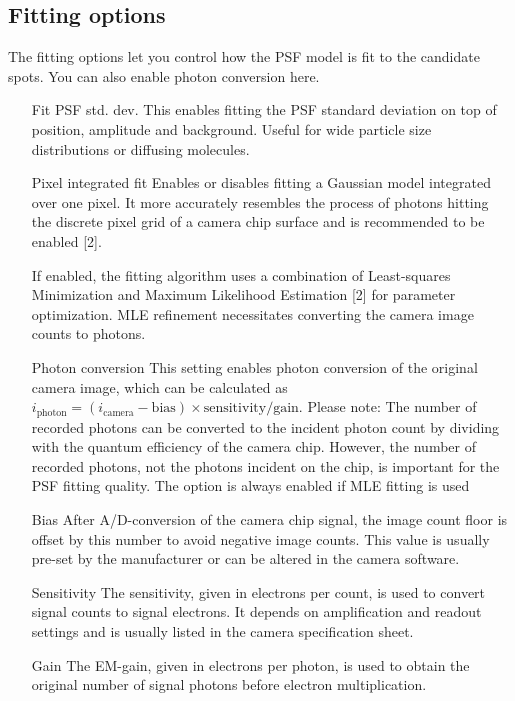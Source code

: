 \documentclass[11pt,onside]{report}
\makeatletter
\numberwithin{equation}{chapter}
\gdef\tshortstack{\@ifnextchar[\@tshortstack{\@tshortstack[c]}}
\gdef\@tshortstack[#1]{%
  \leavevmode
  \vtop\bgroup
    \baselineskip-\p@\lineskip 3\p@
    \let\mb@l\hss\let\mb@r\hss
    \expandafter\let\csname mb@#1\endcsname\relax
    \let\\\@stackcr
    \@ishortstack}
\makeatother
\begin{document}
\subsection*{Fitting options}
The fitting options let you control how the PSF model is fit to the candidate spots. You can also enable photon conversion here.
\begin{itemize}[leftmargin=2cm]
\item[Fit PSF std. dev.] This enables fitting the PSF standard deviation on top of position, amplitude and background. Useful for wide particle size distributions or diffusing molecules.
\item[Pixel integrated fit] Enables or disables fitting a Gaussian model integrated over one pixel. It more accurately resembles the process of photons hitting the discrete pixel grid of a camera chip surface and is recommended to be enabled [2].
\item[\smash{\tshortstack[1]{Maximum Likeli- \\hood refinement}}] If enabled, the fitting algorithm uses a combination of Least-squares Minimization and Maximum Likelihood Estimation [2] for parameter optimization. MLE refinement necessitates converting the camera image counts to photons.
\item[Photon conversion] This setting enables photon conversion of the original camera image, which can be calculated as $i_\mathrm{photon} = (i_\mathrm{camera} - \mathrm{bias})\times \mathrm{sensitivity}/\mathrm{gain}$. Please note: The number of recorded photons can be converted to the incident photon count by dividing with the quantum efficiency of the camera chip. However, the number of recorded photons, not the photons incident on the chip, is important for the PSF fitting quality.  The option is always enabled if MLE fitting is used
\item[Bias] After A/D-conversion of the camera chip signal, the image count floor is offset by this number to avoid negative image counts. This value is usually pre-set by the manufacturer or can be altered in the camera software.
\item[Sensitivity] The sensitivity, given in electrons per count, is used to convert signal counts to signal electrons. It depends on amplification and readout settings and is usually listed in the camera specification sheet.
\item[Gain] The EM-gain, given in electrons per photon, is used to obtain the original number of signal photons before electron multiplication.
\end{itemize}
\end{document}
